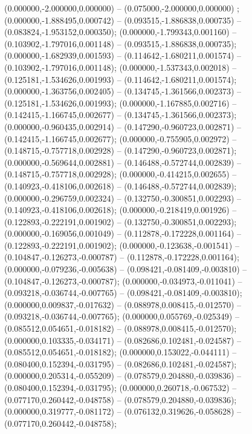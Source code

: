  (0.000000,-2.000000,0.000000) -- (0.075000,-2.000000,0.000000) ;
 (0.000000,-1.888495,0.000742) -- (0.093515,-1.886838,0.000735) -- (0.083824,-1.953152,0.000350);
 (0.000000,-1.799343,0.001160) -- (0.103902,-1.797016,0.001148) -- (0.093515,-1.886838,0.000735);
 (0.000000,-1.682939,0.001593) -- (0.114642,-1.680211,0.001574) -- (0.103902,-1.797016,0.001148);
 (0.000000,-1.537343,0.002018) -- (0.125181,-1.534626,0.001993) -- (0.114642,-1.680211,0.001574);
 (0.000000,-1.363756,0.002405) -- (0.134745,-1.361566,0.002373) -- (0.125181,-1.534626,0.001993);
 (0.000000,-1.167885,0.002716) -- (0.142415,-1.166745,0.002677) -- (0.134745,-1.361566,0.002373);
 (0.000000,-0.960435,0.002914) -- (0.147290,-0.960723,0.002871) -- (0.142415,-1.166745,0.002677);
 (0.000000,-0.755905,0.002972) -- (0.148715,-0.757718,0.002928) -- (0.147290,-0.960723,0.002871);
 (0.000000,-0.569644,0.002881) -- (0.146488,-0.572744,0.002839) -- (0.148715,-0.757718,0.002928);
 (0.000000,-0.414215,0.002655) -- (0.140923,-0.418106,0.002618) -- (0.146488,-0.572744,0.002839);
 (0.000000,-0.296759,0.002324) -- (0.132750,-0.300851,0.002293) -- (0.140923,-0.418106,0.002618);
 (0.000000,-0.218419,0.001926) -- (0.122893,-0.222191,0.001902) -- (0.132750,-0.300851,0.002293);
 (0.000000,-0.169056,0.001049) -- (0.112878,-0.172228,0.001164) -- (0.122893,-0.222191,0.001902);
 (0.000000,-0.123638,-0.001541) -- (0.104847,-0.126273,-0.000787) -- (0.112878,-0.172228,0.001164);
 (0.000000,-0.079236,-0.005638) -- (0.098421,-0.081409,-0.003810) -- (0.104847,-0.126273,-0.000787);
 (0.000000,-0.034973,-0.011041) -- (0.093218,-0.036744,-0.007765) -- (0.098421,-0.081409,-0.003810);
 (0.000000,0.009837,-0.017632) -- (0.088978,0.008415,-0.012570) -- (0.093218,-0.036744,-0.007765);
 (0.000000,0.055769,-0.025349) -- (0.085512,0.054651,-0.018182) -- (0.088978,0.008415,-0.012570);
 (0.000000,0.103335,-0.034171) -- (0.082686,0.102481,-0.024587) -- (0.085512,0.054651,-0.018182);
 (0.000000,0.153022,-0.044111) -- (0.080400,0.152394,-0.031795) -- (0.082686,0.102481,-0.024587);
 (0.000000,0.205314,-0.055209) -- (0.078579,0.204880,-0.039836) -- (0.080400,0.152394,-0.031795);
 (0.000000,0.260718,-0.067532) -- (0.077170,0.260442,-0.048758) -- (0.078579,0.204880,-0.039836);
 (0.000000,0.319777,-0.081172) -- (0.076132,0.319626,-0.058628) -- (0.077170,0.260442,-0.048758);

